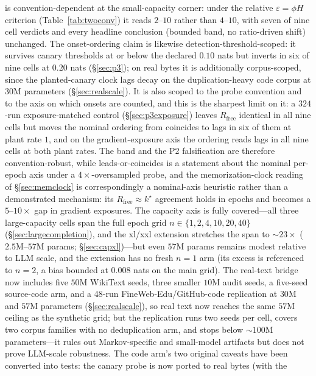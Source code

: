 \documentclass[11pt]{article}
\begin{document}
is convention-dependent at the small-capacity corner: under the relative
$\varepsilon = \phi H$ criterion (Table~\ref{tab:twoconv}) it reads $2$--$10$
rather than $4$--$10$, with seven of nine cell verdicts and every headline
conclusion (bounded band, no ratio-driven shift) unchanged. The onset-ordering
claim is likewise detection-threshold-scoped: it survives canary thresholds at or
below the declared $0.10$ nats but inverts in six of nine cells at $0.20$ nats
(\S\ref{sec:p3}); on real bytes it is additionally corpus-scoped, since the
planted-canary clock lags decay on the duplication-heavy code corpus at $30$M
parameters (\S\ref{sec:realscale}). It is also scoped to the probe convention and to
the axis on which onsets are counted, and this is the sharpest limit on it: a
$324$-run exposure-matched control (\S\ref{sec:p3exposure}) leaves
$R_{\mathrm{free}}$ identical in all nine cells but moves the nominal ordering from
coincides to lags in six of them at plant rate $1$, and on the gradient-exposure
axis the ordering reads lags in all nine cells at both plant rates. The band and the
P2 falsification are therefore convention-robust, while leads-or-coincides is a
statement about the nominal per-epoch axis under a $4\times$-oversampled probe, and
the memorization-clock reading of \S\ref{sec:memclock} is correspondingly a
nominal-axis heuristic rather than a demonstrated mechanism: its
$R_{\mathrm{free}} \approx k^\star$ agreement holds in epochs and becomes a
$5$--$10\times$ gap in gradient exposures. The capacity axis is fully covered---all three large-capacity cells span
the full epoch grid $n\in\{1,2,4,10,20,40\}$ (\S\ref{sec:largecompletion}), and the
xl/xxl extension stretches the span to $\sim 23\times$ ($2.5$M--$57$M params;
\S\ref{sec:capxl})---but even $57$M params
remains modest relative to LLM scale, and the extension has no fresh $n{=}1$ arm
(its excess is referenced to $n{=}2$, a bias bounded at $0.008$ nats on the main grid). The
real-text bridge now includes five $50$M WikiText seeds, three smaller $10$M audit
seeds, a five-seed source-code arm, and a 48-run FineWeb-Edu/GitHub-code
replication at $30$M and $57$M parameters (\S\ref{sec:realscale}), so real text
now reaches the same $57$M ceiling as the synthetic grid; but the replication runs
two seeds per cell, covers two corpus families with no deduplication arm, and
stops below ${\sim}100$M parameters---it rules out Markov-specific and
small-model artifacts but does not prove LLM-scale robustness. The code arm's two original caveats have
been converted into tests: the canary probe is now ported to real bytes (with the
\end{document}
